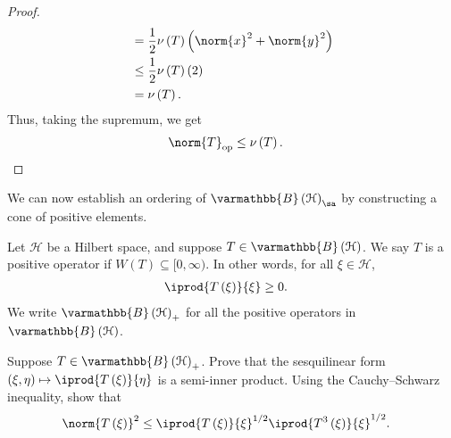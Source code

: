 \documentclass[10pt]{mypackage}
\renewcommand*{\mathbb}[1]{\varmathbb{#1}}
\newcommand{\B}{\mathbb{B}}
\begin{document}
\begin{proof}
\begin{align*}
                                                      &= \frac{1}{2}\nu\left(T\right)\left(\norm{x}^2 + \norm{y}^2\right)\\
                                                      &\leq \frac{1}{2}\nu\left(T\right)\left(2\right)\\
                                                      &= \nu\left(T\right).
  \end{align*}
  Thus, taking the supremum, we get
  \begin{align*}
    \norm{T}_{\text{op}} &\leq \nu\left(T\right).
  \end{align*}
\end{proof}
We can now establish an ordering of $\B\left(\mathcal{H}\right)_{\sa}$ by constructing a cone of positive elements.
\begin{definition}
  Let $\mathcal{H}$ be a Hilbert space, and suppose $T\in \B\left(\mathcal{H}\right)$. We say $T$ is a positive operator if $W(T) \subseteq [0,\infty)$. In other words, for all $\xi\in \mathcal{H}$,
  \begin{align*}
    \iprod{T\left(\xi\right)}{\xi} &\geq 0.
  \end{align*}
  We write $\B\left(\mathcal{H}\right)_{+}$ for all the positive operators in $\B\left(\mathcal{H}\right)$.
\end{definition}
\begin{exercise}
  Suppose $T\in \B\left(\mathcal{H}\right)_{+}$. Prove that the sesquilinear form $\left(\xi,\eta\right)\mapsto \iprod{T\left(\xi\right)}{\eta}$ is a semi-inner product. Using the Cauchy--Schwarz inequality, show that
  \begin{align*}
    \norm{T\left(\xi\right)}^2 &\leq \iprod{T\left(\xi\right)}{\xi}^{1/2} \iprod{T^3\left(\xi\right)}{\xi}^{1/2}.
  \end{align*}
\end{exercise}
\end{document}
